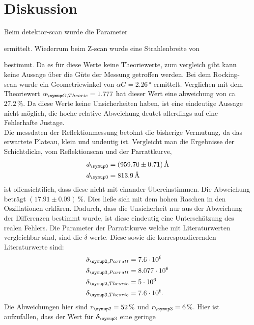 \section{Diskussion}
Beim detektor-scan wurde die Parameter 

ermittelt. Wiederrum beim Z-scan wurde eine Strahlenbreite von 
 
bestimmt. Da es für diese Werte keine Theoriewerte, zum vergleich gibt kann keine Aussage über die Güte der Messung getroffen werden.
Bei dem Rocking-scan wurde ein Geometriewinkel von $\alpha{G} = 2.26\,°$ ermittelt. Verglichen mit dem Theoriewert $\alpha\idx{G, Theorie} = 1.777$
hat dieser Wert eine abweichung von ca $27.2\,\%$. Da diese Werte keine Unsicherheiten haben, ist eine eindeutige Aussage nicht möglich,
die hoche relative Abweichung deutet allerdings auf eine Fehlerhafte Justage.\\
Die messdaten der Reflektionmessung betohnt die bisherige Vermutung, da das erwartete Plateau, klein und undeutig ist. Vergleicht man 
die Ergebnisse der Schichtdicke, vom Reflektionscan und der Parrattkurve, 
\begin{equation}
\begin{aligned}
    d\idx{0} &= (959.70 \pm 0.71)\,\si{\angstrom} \\
    d\idx{0} &= 813.9\,\si{\angstrom} \\
\end{aligned}
\end{equation}
ist offensichtilich, dass diese nicht mit einander Übereinstimmen. Die Abweichung beträgt $(17.91 \pm0.09)\,\%$. Dies ließe sich mit dem 
hohen Raschen in den Oszillationen erklären. Dadurch, dass die Unsicherheit nur aus der Abweichung der Differenzen bestimmt wurde,
ist diese eindeutig eine Unterschätzung des realen Fehlers.
Die Parameter der Parrattkurve welche mit Literaturwerten \cite{V44} vergleichbar sind, sind die $\delta$ werte. Diese sowie die 
korrespondierenden Literaturwerte sind:
\begin{equation}
    \begin{aligned}
        \delta\idx{2, Parratt} &= 7.6\cdot 10^{6} \\
        \delta\idx{3, Parratt} &= 8.077\cdot 10^{6} \\
        \delta\idx{2, Theorie} &= 5\cdot 10^{6} \\
        \delta\idx{3, Theorie} &= 7.6\cdot 10^{6}. \\
    \end{aligned}
\end{equation}
Die Abweichungen hier sind $r\idx{2} = 52\,\%$ und $r\idx{3} = 6\,\%$. Hier ist aufzufallen, dass der Wert für $\delta\idx{3}$ eine geringe
